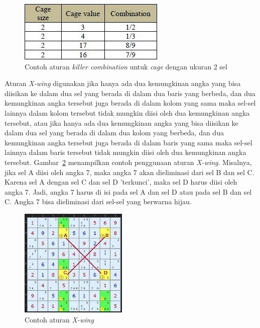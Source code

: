 \documentclass[a4paper,twoside]{article}
\begin{document}
\begin{enumerate}
\begin{figure}
\centering
\captionsetup{justification=centering}
\includegraphics[scale=1]{Gambar/HybridGenetic5}
\caption[Contoh aturan  \textit{killer combination} untuk \textit{cage} dengan ukuran 2 sel  ~\cite{JohannaLukasSaputra}]{Contoh aturan  \textit{killer combination} untuk \textit{cage} dengan ukuran 2 sel ~\cite{JohannaLukasSaputra}}
\label{fig:hybrid5}
\end{figure}

Aturan \textit{X-wing} digunakan jika hanya ada dua kemungkinan angka yang bisa diisikan ke dalam dua sel yang berada di dalam dua baris yang berbeda, dan dua kemungkinan angka tersebut juga berada di dalam kolom yang sama maka sel-sel lainnya dalam kolom tersebut tidak mungkin diisi oleh dua kemungkinan angka tersebut, atau jika hanya ada dua kemungkinan angka yang bisa diisikan ke dalam dua sel yang berada di dalam dua kolom yang berbeda, dan dua kemungkinan angka tersebut juga berada di dalam baris yang sama maka sel-sel lainnya dalam baris tersebut tidak mungkin diisi oleh dua kemungkinan angka tersebut. Gambar~\ref{fig:hybrid6} menampilkan contoh penggunaan aturan \textit{X-wing}. Misalnya, jika sel A diisi oleh angka 7, maka angka 7 akan dieliminasi dari sel B dan sel C. Karena sel A dengan sel C dan sel D 'terkunci', maka sel D harus diisi oleh angka 7. Jadi, angka 7 harus di isi pada sel A dan sel D atau pada sel B dan sel C. Angka 7 bisa dieliminasi dari sel-sel yang berwarna hijau.

\begin{figure}
\centering
\captionsetup{justification=centering}
\includegraphics[scale=1]{Gambar/HybridGenetic6}
\caption[Contoh aturan  \textit{X-wing}  ~\cite{JohannaLukasSaputra}]{Contoh aturan  \textit{X-wing} ~\cite{JohannaLukasSaputra}}
\label{fig:hybrid6}
\end{figure}


\end{enumerate}
\end{document}
